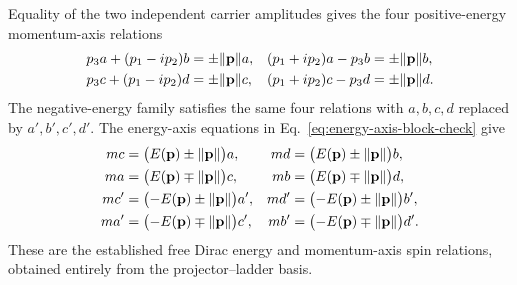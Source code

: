 Equality of the two independent carrier amplitudes gives the four
positive-energy momentum-axis relations
\begin{align*}
p_3a+(p_1-ip_2)b&=\pm\|\mathbf{p}\|a,
&
(p_1+ip_2)a-p_3b&=\pm\|\mathbf{p}\|b,\\
p_3c+(p_1-ip_2)d&=\pm\|\mathbf{p}\|c,
&
(p_1+ip_2)c-p_3d&=\pm\|\mathbf{p}\|d.
\end{align*}
The negative-energy family satisfies the same four relations with
\(a,b,c,d\) replaced by \(a',b',c',d'\). The energy-axis equations in
Eq.\ \eqref{eq:energy-axis-block-check} give
\begin{align*}
mc&=\bigl(E(\mathbf{p})\pm\|\mathbf{p}\|\bigr)a,
&
md&=\bigl(E(\mathbf{p})\pm\|\mathbf{p}\|\bigr)b,\\
ma&=\bigl(E(\mathbf{p})\mp\|\mathbf{p}\|\bigr)c,
&
mb&=\bigl(E(\mathbf{p})\mp\|\mathbf{p}\|\bigr)d,\\
mc'&=\bigl(-E(\mathbf{p})\pm\|\mathbf{p}\|\bigr)a',
&
md'&=\bigl(-E(\mathbf{p})\pm\|\mathbf{p}\|\bigr)b',\\
ma'&=\bigl(-E(\mathbf{p})\mp\|\mathbf{p}\|\bigr)c',
&
mb'&=\bigl(-E(\mathbf{p})\mp\|\mathbf{p}\|\bigr)d'.
\end{align*}
These are the established free Dirac energy and momentum-axis spin
relations, obtained entirely from the projector--ladder basis.

